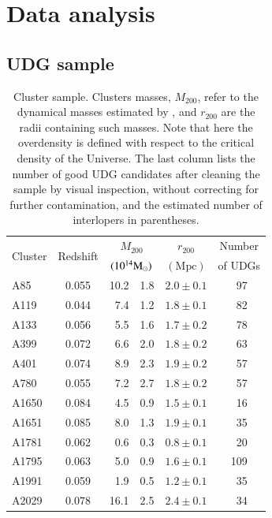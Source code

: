 \documentclass[usenatbib,fleqn]{mnras}
\begin{document}
\section{Data analysis}
\label{s:data}


\subsection{UDG sample}

\begin{table}
 \centering
\caption{Cluster sample. Clusters masses, $M_{200}$, refer to the dynamical masses estimated by \citet{sifon15_cccp}, and $r_{200}$ are the radii containing such masses. Note that here the overdensity is defined with respect to the critical density of the Universe. The last column lists the number of good UDG candidates after cleaning the sample by visual inspection, without correcting for further contamination, and the estimated number of interlopers in parentheses.}
\label{t:clusters}
\begin{tabular}{l c r@{ $\pm$ }l c c}
\hline\hline
 \multirow{2}{*}{Cluster} & \multirow{2}{*}{Redshift} & \multicolumn{2}{c}{$M_{200}$} & $r_{200}$ & Number \\
         &          & \multicolumn{2}{c}{$(10^{14}\mathrm{M}_\odot)$} & $(\mathrm{Mpc})$ & of UDGs  \\[0.5ex]
\hline
%
A85        & 0.055 & 10.2 & 1.8 & $2.0\pm0.1$ &      \,\,\,97 \\
A119       & 0.044 &  7.4 & 1.2 & $1.8\pm0.1$ &      \,\,\,82 \\
A133       & 0.056 &  5.5 & 1.6 & $1.7\pm0.2$ &      \,\,\,78 \\
A399       & 0.072 &  6.6 & 2.0 & $1.8\pm0.2$ &      \,\,\,63 \\
A401       & 0.074 &  8.9 & 2.3 & $1.9\pm0.2$ &      \,\,\,57 \\
A780       & 0.055 &  7.2 & 2.7 & $1.8\pm0.2$ &      \,\,\,57 \\
A1650      & 0.084 &  4.5 & 0.9 & $1.5\pm0.1$ &      \,\,\,16 \\
A1651      & 0.085 &  8.0 & 1.3 & $1.9\pm0.1$ &      \,\,\,35 \\
A1781      & 0.062 &  0.6 & 0.3 & $0.8\pm0.1$ &      \,\,\,20 \\
A1795      & 0.063 &  5.0 & 0.9 & $1.6\pm0.1$ &           109 \\
A1991      & 0.059 &  1.9 & 0.5 & $1.2\pm0.1$ &      \,\,\,35 \\
A2029      & 0.078 & 16.1 & 2.5 & $2.4\pm0.1$ &      \,\,\,34 \\

\end{tabular}
\end{table}
\end{document}

